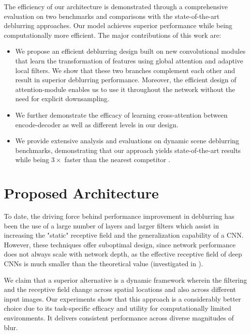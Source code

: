 \documentclass[10pt,twocolumn,letterpaper]{article}
\begin{document}
The efficiency of our architecture is demonstrated through a comprehensive evaluation on two benchmarks and comparisons with the state-of-the-art deblurring approaches. Our model achieves superior performance while being computationally more efficient. The major contributions of this work are:
\renewcommand{\labelenumi}{\Roman{enumi}}
\begin{itemize}


    \item We propose an efficient deblurring design built on new convolutional modules that learn the transformation of features using global attention and adaptive local filters. We show that these two branches complement each other and result in superior deblurring performance. Moreover, the efficient design of attention-module enables us to use it throughout the network without the need for explicit downsampling.
    
    \item We further demonstrate the efficacy of learning cross-attention between encode-decoder as well as different levels in our design.
    
    \item We provide extensive analysis and evaluations on dynamic scene deblurring benchmarks, demonstrating that our approach yields state-of-the-art results while being $3\times$ faster than the nearest competitor \cite{zhang2019deep}.
\end{itemize}





\section{Proposed Architecture}
To date, the driving force behind performance improvement in deblurring has been the use of a large number of layers and larger filters which assist in increasing the "static" receptive field and the generalization capability of a CNN. However, these techniques offer suboptimal design, since network performance does not always scale with network depth, as the effective receptive field of deep CNNs is much smaller than the theoretical value (investigated in \cite{luo2016understanding}).

We claim that a superior alternative is a dynamic framework wherein the filtering and the receptive field change across spatial locations and also across different input images. Our experiments show that this approach is a considerably better choice due to its task-specific efficacy and utility for computationally limited environments. It delivers consistent performance across diverse magnitudes of blur.
\end{document}
